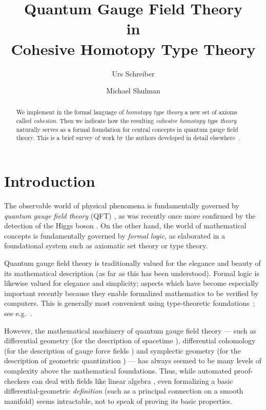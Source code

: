 \documentclass[copyright,12pt]{eptcs}
\title{Quantum Gauge Field Theory \\ in  \\ Cohesive Homotopy Type Theory}
\author{
  Urs Schreiber
  \institute{University Nijmegen\\ The Netherlands}
  \email{urs.schreiber@gmail.com}
  \and
  Michael Shulman
  \institute{University of San Diego\\
    San Diego, CA, USA}
  \email{shulman@sandiego.edu}}
\begin{document}
\maketitle

\begin{abstract}
  We implement in the formal language of \emph{homotopy type theory} a new set of axioms called \emph{cohesion}.
  Then we indicate how the resulting \emph{cohesive homotopy type theory} naturally serves
  as a formal foundation for central concepts in quantum gauge field theory.
  This is a brief survey of work by the authors developed in detail elsewhere~\cite{ShulmanCohesion,SchreiberCohesion}.
\end{abstract}



\section{Introduction}
\label{sec:introduction}

The observable world of physical phenomena is fundamentally governed by
\emph{quantum gauge field theory} (QFT) \cite{Deligne},
as was recently once more confirmed by the
detection \cite{CERNPressRelease} of the Higgs boson \cite{Bernstein}.
On the other hand, the world of mathematical concepts
is fundamentally governed by \emph{formal logic}, as elaborated in a foundational system such as axiomatic set theory or type theory.

Quantum gauge field theory is traditionally valued for the elegance and beauty
of its mathematical description (as far as this has been understood).
Formal logic is likewise valued for elegance and simplicity; aspects which have become especially important recently because they enable formalized mathematics to be verified by computers.
This is generally most convenient using type-theoretic foundations~\cite{MartinLoef}; see e.g.~\cite{Coquand}.

However, the mathematical machinery of quantum gauge field theory ---
such as differential geometry
(for the description of spacetime \cite{GS}),
differential cohomology
(for the description of gauge force fields \cite{HopkinsSinger, Freed})
and symplectic geometry
(for the description of geometric quantization \cite{Brylinski})
--- has always seemed to be many levels of complexity above the mathematical foundations.
Thus, while automated proof-checkers
can deal with fields like linear algebra \cite{Coquand},
even formalizing a basic differential-geometric \emph{definition} (such as a principal connection on a smooth manifold) seems intractable,
not to speak of proving its basic properties.
\end{document}
